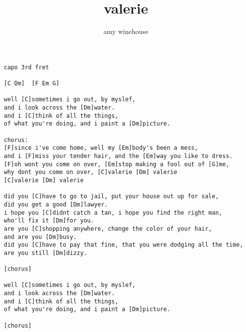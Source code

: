 \author{amy winehouse}
\title{valerie}
\maketitle
\begin{verbatim}
capo 3rd fret

[C Dm]  [F Em G]

well [C]sometimes i go out, by myslef,
and i look across the [Dm]water.
and i [C]think of all the things,
of what you're doing, and i paint a [Dm]picture.

chorus:
[F]since i've come home, well my [Em]body's been a mess,
and i [F]miss your tender hair, and the [Em]way you like to dress.
[F]oh wont you come on over, [Em]stop making a fool out of [G]me,
why dont you come on over, [C]valerie [Dm] valerie
[C]valerie [Dm] valerie

did you [C]have to go to jail, put your house out up for sale,
did you get a good [Dm]lawyer.
i hope you [C]didnt catch a tan, i hope you find the right man,
who'll fix it [Dm]for you.
are you [C]shopping anywhere, change the color of your hair,
and are you [Dm]busy.
did you [C]have to pay that fine, that you were dodging all the time,
are you still [Dm]dizzy.

[chorus]

well [C]sometimes i go out, by myslef,
and i look across the [Dm]water.
and i [C]think of all the things,
of what you're doing, and i paint a [Dm]picture.

[chorus]
\end{verbatim}